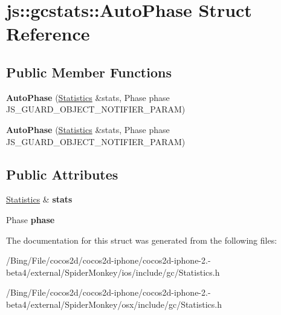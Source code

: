 \hypertarget{structjs_1_1gcstats_1_1_auto_phase}{\section{js\-:\-:gcstats\-:\-:Auto\-Phase Struct Reference}
\label{structjs_1_1gcstats_1_1_auto_phase}
}
\subsection*{Public Member Functions}
\begin{DoxyCompactItemize}
\item 
\hypertarget{structjs_1_1gcstats_1_1_auto_phase_aacb72448e8d95ce9774748e3e602519b}{{\bfseries Auto\-Phase} (\hyperlink{structjs_1_1gcstats_1_1_statistics}{Statistics} \&stats, Phase phase J\-S\-\_\-\-G\-U\-A\-R\-D\-\_\-\-O\-B\-J\-E\-C\-T\-\_\-\-N\-O\-T\-I\-F\-I\-E\-R\-\_\-\-P\-A\-R\-A\-M)}\label{structjs_1_1gcstats_1_1_auto_phase_aacb72448e8d95ce9774748e3e602519b}

\item 
\hypertarget{structjs_1_1gcstats_1_1_auto_phase_aacb72448e8d95ce9774748e3e602519b}{{\bfseries Auto\-Phase} (\hyperlink{structjs_1_1gcstats_1_1_statistics}{Statistics} \&stats, Phase phase J\-S\-\_\-\-G\-U\-A\-R\-D\-\_\-\-O\-B\-J\-E\-C\-T\-\_\-\-N\-O\-T\-I\-F\-I\-E\-R\-\_\-\-P\-A\-R\-A\-M)}\label{structjs_1_1gcstats_1_1_auto_phase_aacb72448e8d95ce9774748e3e602519b}

\end{DoxyCompactItemize}
\subsection*{Public Attributes}
\begin{DoxyCompactItemize}
\item 
\hypertarget{structjs_1_1gcstats_1_1_auto_phase_ae7ba48daa5a6ef00ddc2326d07c3e087}{\hyperlink{structjs_1_1gcstats_1_1_statistics}{Statistics} \& {\bfseries stats}}\label{structjs_1_1gcstats_1_1_auto_phase_ae7ba48daa5a6ef00ddc2326d07c3e087}

\item 
\hypertarget{structjs_1_1gcstats_1_1_auto_phase_a6bdbe1dfd6d7c64e9299d7bb207d0857}{Phase {\bfseries phase}}\label{structjs_1_1gcstats_1_1_auto_phase_a6bdbe1dfd6d7c64e9299d7bb207d0857}

\end{DoxyCompactItemize}


The documentation for this struct was generated from the following files\-:\begin{DoxyCompactItemize}
\item 
/\-Bing/\-File/cocos2d/cocos2d-\/iphone/cocos2d-\/iphone-\/2.-\/beta4/external/\-Spider\-Monkey/ios/include/gc/Statistics.\-h\item 
/\-Bing/\-File/cocos2d/cocos2d-\/iphone/cocos2d-\/iphone-\/2.-\/beta4/external/\-Spider\-Monkey/osx/include/gc/Statistics.\-h\end{DoxyCompactItemize}

